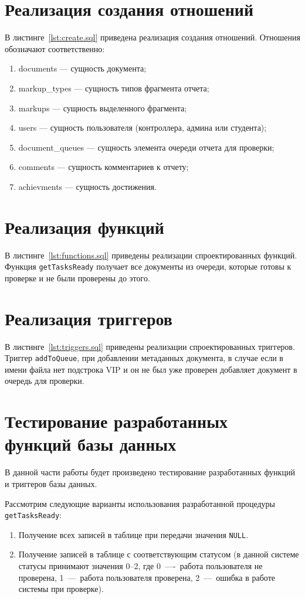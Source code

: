\section{Реализация создания отношений}
В листинге~\ref{lst:create.sql} приведена реализация создания отношений.
Отношения обозначают соответственно:
\begin{enumerate}
	\item documents --- сущность документа;
	\item markup\_types --- сущность типов фрагмента отчета;
	\item markups --- сущность выделенного фрагмента;
	\item users --- сущность пользователя (контроллера, админа или студента);
	\item document\_queues --- сущность элемента очереди отчета для проверки;
	\item comments --- сущность комментариев к отчету;
	\item achievments --- сущность достижения.
\end{enumerate}


\section{Реализация функций}
В листинге~\ref{lst:functions.sql} приведены реализации спроектированных функций. Функция \texttt{getTasksReady} получает все документы из очереди, которые готовы к проверке и не были проверены до этого.

\section{Реализация триггеров}
В листинге~\ref{lst:triggers.sql} приведены реализации спроектированных триггеров. Триггер \texttt{addToQueue}, при добавлении метаданных документа, в случае если в имени файла нет подстрока VIP и он не был уже проверен добавляет документ в очередь для проверки.

\section{Тестирование разработанных функций базы данных}
В данной части работы будет произведено тестирование разработанных функций и триггеров базы данных.

Рассмотрим следующие варианты использования разработанной процедуры \texttt{getTasksReady}:
\begin{enumerate}
	\item Получение всех записей в таблице при передачи значения \texttt{NULL}.
	\item Получение записей в таблице с соответствующим статусом (в данной системе статусы принимают значения 0--2, где 0~----~работа пользователя не проверена, 1~---~работа пользователя проверена, 2~---~ошибка в работе системы при проверке).
\end{enumerate}

